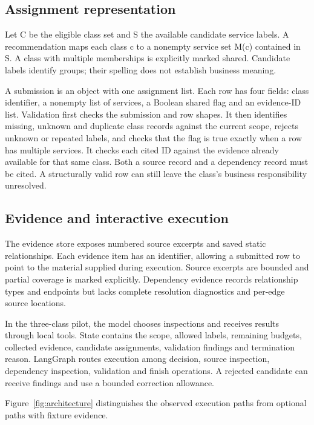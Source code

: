 \subsection{Assignment representation}

Let C be the eligible class set and S the available candidate service labels. A recommendation maps each class c to a nonempty service set M(c) contained in S. A class with multiple memberships is explicitly marked shared. Candidate labels identify groups; their spelling does not establish business meaning.

A submission is an object with one assignment list. Each row has four fields: class identifier, a nonempty list of services, a Boolean shared flag and an evidence-ID list. Validation first checks the submission and row shapes. It then identifies missing, unknown and duplicate class records against the current scope, rejects unknown or repeated labels, and checks that the flag is true exactly when a row has multiple services. It checks each cited ID against the evidence already available for that same class. Both a source record and a dependency record must be cited. A structurally valid row can still leave the class's business responsibility unresolved.

\subsection{Evidence and interactive execution}

The evidence store exposes numbered source excerpts and saved static relationships. Each evidence item has an identifier, allowing a submitted row to point to the material supplied during execution. Source excerpts are bounded and partial coverage is marked explicitly. Dependency evidence records relationship types and endpoints but lacks complete resolution diagnostics and per-edge source locations.

In the three-class pilot, the model chooses inspections and receives results through local tools. State contains the scope, allowed labels, remaining budgets, collected evidence, candidate assignments, validation findings and termination reason. LangGraph routes execution among decision, source inspection, dependency inspection, validation and finish operations. A rejected candidate can receive findings and use a bounded correction allowance.

Figure~\ref{fig:architecture} distinguishes the observed execution paths from optional paths with fixture evidence.

